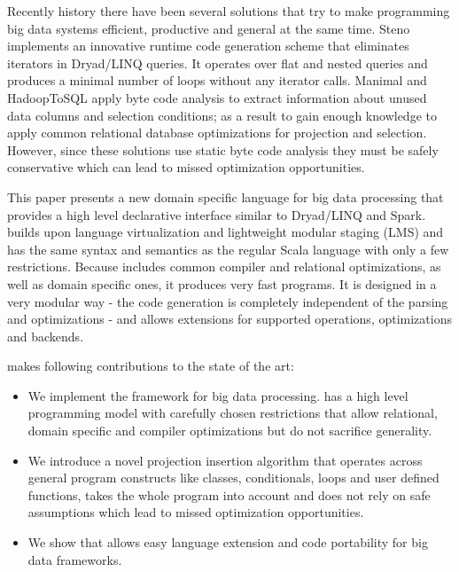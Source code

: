 Recently history there have been several solutions that try to make programming big data systems efficient, productive and general at the same time. Steno \cite{murray_steno:_2011} implements an innovative runtime code generation scheme that eliminates iterators in Dryad/LINQ queries. It operates over flat and nested queries and produces a minimal number of loops without any iterator calls. Manimal \cite{jahani_automatic_2011} and HadoopToSQL \cite{iu_hadooptosql:_2010} apply byte code analysis to extract information about unused data columns and selection conditions; as a result to gain enough knowledge to apply common relational database optimizations for projection and selection. However, since these solutions use static byte code analysis they must be safely conservative which can lead to missed optimization opportunities.

This paper presents a new domain specific language \tool for big data processing that provides a high level declarative interface similar to Dryad/LINQ and Spark. \tool builds upon language virtualization \cite{moors_scala-virtualized_2012} and lightweight modular staging \cite{rompf_lightweight_2010} (LMS) and has the same syntax and semantics as the regular Scala language with only a few restrictions.
Because \tool includes common compiler and relational optimizations, as well as domain specific ones, it produces very fast programs. It is designed in a very modular way - the code generation is completely independent of the parsing and optimizations - and allows extensions for supported operations, optimizations and backends. 

\tool makes following contributions to the state of the art:    
\begin{itemize}

  \item We implement the \tool framework for big data processing. \tool has a high level programming model with carefully chosen restrictions that allow relational, domain specific and compiler optimizations but do not sacrifice generality.

  \item We introduce a novel projection insertion algorithm that operates across general program constructs like classes, conditionals, loops and user defined functions, takes the whole program into account and does not rely on safe assumptions which lead to missed optimization opportunities.  

  \item We show that \tool allows easy language extension and code portability for big data frameworks. 

\end{itemize} 

